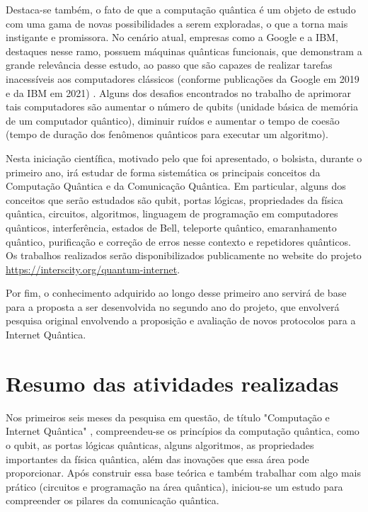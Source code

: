 \documentclass{article}
\begin{document}
	Destaca-se também, o fato de que a computação quântica é um objeto de estudo com uma gama de novas possibilidades a serem exploradas, o que a torna mais instigante e promissora. No cenário atual, empresas como a Google e a IBM, destaques nesse ramo, possuem máquinas quânticas funcionais, que demonstram a grande relevância desse estudo, ao passo que são capazes de realizar tarefas inacessíveis aos computadores clássicos (conforme publicações da Google em 2019 e da IBM em 2021) . Alguns dos desafios encontrados no trabalho de aprimorar tais computadores são aumentar o número de qubits (unidade básica de memória de um computador quântico), diminuir ruídos e aumentar o tempo de coesão (tempo de duração dos fenômenos quânticos para executar um algoritmo).
 
	Nesta iniciação científica, motivado pelo que foi apresentado, o bolsista, durante o primeiro ano, irá estudar de forma sistemática os principais conceitos da Computação Quântica e da Comunicação Quântica. Em particular, alguns dos  conceitos que serão estudados são qubit, portas lógicas, propriedades da física quântica, circuitos, algoritmos, linguagem de programação em computadores quânticos, interferência, estados de Bell, teleporte quântico, emaranhamento quântico, purificação e correção de erros nesse contexto e repetidores quânticos. Os trabalhos realizados serão disponibilizados publicamente no website do projeto \href{https://interscity.org/quantum-internet/}{https://interscity.org/quantum-internet}.
 
	Por fim, o conhecimento adquirido ao longo desse primeiro ano servirá de base para a proposta a ser desenvolvida no segundo ano do projeto, que envolverá pesquisa original envolvendo a proposição e avaliação de novos protocolos para a Internet Quântica.

\newpage

\section{Resumo das atividades realizadas}
    Nos primeiros seis meses da pesquisa em questão, de título "Computação e Internet Quântica" , compreendeu-se os princípios da computação quântica, como o qubit, as portas lógicas quânticas, alguns algoritmos, as propriedades importantes da física quântica, além das inovações que essa área  pode proporcionar. Após construir essa base teórica e também trabalhar com algo mais prático (circuitos e programação na área quântica), iniciou-se um estudo para compreender os pilares da comunicação quântica.
\end{document}
